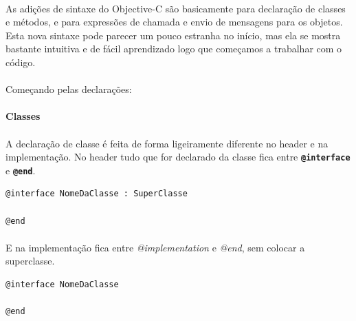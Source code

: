 \documentclass[a4paper,12pt,brazil,doubleside]{book}
\begin{document}
\paragraph{}As adições de sintaxe do Objective-C são basicamente para declaração de classes e métodos, e para expressões de chamada e envio de mensagens para os objetos. Esta nova sintaxe pode parecer um pouco estranha no início, mas ela se mostra bastante intuitiva e de fácil aprendizado logo que começamos a trabalhar com o código.
\paragraph{}Começando pelas declarações:

\bigskip 

\paragraph{}\textbf{Classes}

\paragraph{}A declaração de classe é feita de forma ligeiramente diferente no header e na implementação. No header tudo que for declarado da classe fica entre \texttt{\textbf{@interface}} e \texttt{\textbf{@end}}.

\begin{listing}
\begin{verbatim}
@interface NomeDaClasse : SuperClasse

@end
\end{verbatim}
\end{listing}

\paragraph{}E na implementação fica entre \textit{@implementation
} e \textit{@end}, sem colocar a superclasse.

\begin{listing}
\begin{verbatim}
@interface NomeDaClasse

@end
\end{verbatim}
\end{listing}

\bigskip 
\end{document}
